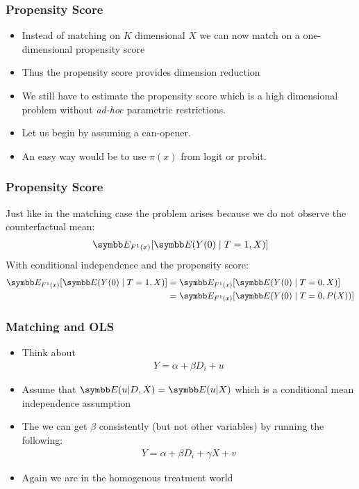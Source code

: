 \documentclass[aspectratio=169,11pt]{beamer}
\begin{document}
\begin{frame}
\frametitle{Propensity Score}
\begin{itemize}
\item Instead of matching on $K$ dimensional $X$ we can now match on a one-dimensional propensity score
\item Thus the propensity score provides \alert{dimension reduction}
\item We still have to estimate the propensity score which is a high dimensional problem without \textit{ad-hoc} parametric restrictions.
\item Let us begin by assuming a can-opener.
\item An easy way would be to use $\pi(x)$ from logit or probit.
\end{itemize}
\end{frame}


\begin{frame}
\frametitle{Propensity Score}
Just like in the matching case the problem arises because we do not observe the counterfactual mean:
\begin{align*}
 \E_{F^1(x)} [\E(Y(0) \mid T=1,X)] 
\end{align*}
With conditional independence and the propensity score:
\begin{align*}
 \E_{F^1(x)} [\E(Y(0) \mid T=1,X)]  &=  \E_{F^1(x)} [\E(Y(0) \mid T=0,X)] \\
 &=  \E_{F^1(x)} [\E(Y(0) \mid T=0,P(X))] 
\end{align*}
\end{frame}

\begin{frame}
\frametitle{Matching and OLS}
\begin{itemize}
\item Think about
\begin{eqnarray*}
Y  = \alpha + \beta D_i + u
\end{eqnarray*}
\item Assume that $\E(u | D,X) = \E(u | X)$ which is a conditional mean independence assumption
\item The we can get $\beta$ consistently (but not other variables) by running the following:
\begin{eqnarray*}
Y = \alpha + \beta D_i + \gamma X + v
\end{eqnarray*}
\item Again we are in the homogenous treatment world
\end{itemize}
\end{frame}
\end{document}
